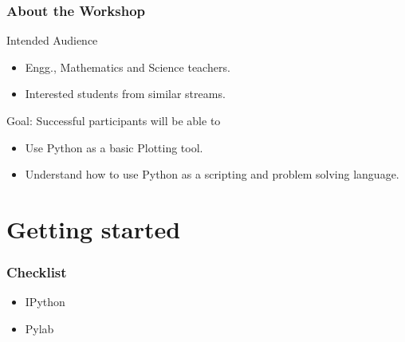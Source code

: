 \documentclass[14pt,compress]{beamer}
\newcommand{\typ}[1]{\lstinline{#1}}
\begin{document}
\begin{frame}
  \frametitle{About the Workshop}
  \begin{block}{Intended Audience}
  \begin{itemize}
       \item Engg., Mathematics and Science teachers.
       \item Interested students from similar streams.
  \end{itemize}
  \end{block}  

  \begin{block}{Goal: Successful participants will be able to}
    \begin{itemize}
      \item Use Python as a basic Plotting tool.
      \item Understand how to use Python as a scripting and problem solving language.

    \end{itemize}
  \end{block}
\end{frame}

\section{Getting started}
\begin{frame}
\frametitle{Checklist}
   \begin{itemize}
    \item IPython
    \item Pylab
  \end{itemize}
\end{frame}
\end{document}

